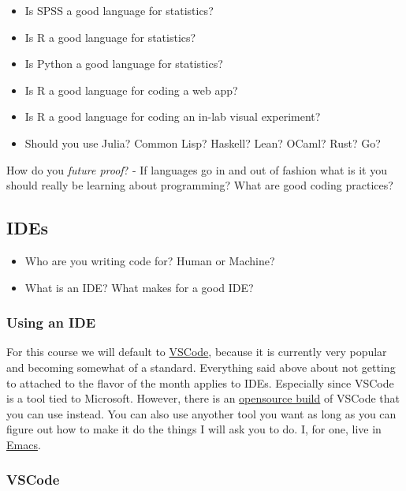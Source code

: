 \documentclass[
  letterpaper,
  DIV=11,
  numbers=noendperiod]{scrreprt}
\providecommand{\tightlist}{%
  \setlength{\itemsep}{0pt}\setlength{\parskip}{0pt}}\usepackage{longtable,booktabs,array}
\begin{document}
\begin{itemize}
\tightlist
\item
  Is SPSS a good language for statistics?
\item
  Is R a good language for statistics?
\item
  Is Python a good language for statistics?
\item
  Is R a good language for coding a web app?
\item
  Is R a good language for coding an in-lab visual experiment?
\item
  Should you use Julia? Common Lisp? Haskell? Lean? OCaml? Rust? Go?
\end{itemize}

How do you \emph{future proof}? - If languages go in and out of fashion
what is it you should really be learning about programming? What are
good coding practices?

\subsection{IDEs}\label{ides}

\begin{itemize}
\tightlist
\item
  Who are you writing code for? Human or Machine?
\item
  What is an IDE? What makes for a good IDE?
\end{itemize}

\subsubsection{Using an IDE}\label{using-an-ide}

For this course we will default to
\href{https://code.visualstudio.com/}{VSCode}, because it is currently
very popular and becoming somewhat of a standard. Everything said above
about not getting to attached to the flavor of the month applies to
IDEs. Especially since VSCode is a tool tied to Microsoft. However,
there is an \href{https://vscodium.com/}{opensource build} of VSCode
that you can use instead. You can also use anyother tool you want as
long as you can figure out how to make it do the things I will ask you
to do. I, for one, live in
\href{https://www.gnu.org/software/emacs/}{Emacs}.

\subsubsection{VSCode}\label{vscode-1}
\end{document}
